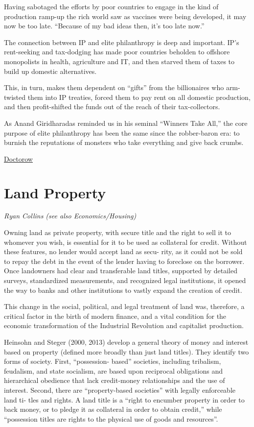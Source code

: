 \documentclass[
]{book}
\begin{document}
Having sabotaged the efforts by poor countries to engage in the kind of production ramp-up the rich world saw as vaccines were being developed, it may now be too late. ``Because of my bad ideas then, it's too late now.''

The connection between IP and elite philanthropy is deep and important. IP's rent-seeking and tax-dodging has made poor countries beholden to offshore monopolists in health, agriculture and IT, and then starved them of taxes to build up domestic alternatives.

This, in turn, makes them dependent on ``gifts'' from the billionaires who arm-twisted them into IP treaties, forced them to pay rent on all domestic production, and then profit-shifted the funds out of the reach of their tax-collectors.

As Anand Giridharadas reminded us in his seminal ``Winners Take All,'' the core purpose of elite philanthropy has been the same since the robber-baron era: to burnish the reputations of monsters who take everything and give back crumbs.

\href{https://pluralistic.net/2021/04/13/public-interest-pharma/\#gates-foundation}{Doctorow}

\hypertarget{land-property}{%
\section{Land Property}\label{land-property}}

\emph{Ryan Collins (see also Economics/Housing)}

Owning land as private property, with secure title and the right to sell
it to whomever you wish, is essential for it to be used as collateral for
credit. Without these features, no lender would accept land as secu-
rity, as it could not be sold to repay the debt in the event of the lender
having to foreclose on the borrower. Once landowners had clear and
transferable land titles, supported by detailed surveys, standardized
measurements, and recognized legal institutions, it opened the way
to banks and other institutions to vastly expand the creation of credit.

This change in the social, political, and legal treatment of land was,
therefore, a critical factor in the birth of modern finance, and a
vital condition for the economic transformation of the Industrial
Revolution and capitalist production.

Heinsohn and Steger (2000, 2013) develop a general theory of
money and interest based on property (defined more broadly than
just land titles). They identify two forms of society. First, ``possession-­
based'' societies, including tribalism, feudalism, and state socialism,
are based upon reciprocal obligations and hierarchical obedience
that lack credit-­money relationships and the use of interest. Second,
there are ``property-­based societies'' with legally enforceable land ti-
tles and rights. A land title is a ``right to encumber property in order
to back money, or to pledge it as collateral in order to obtain credit,''
while ``possession titles are rights to the physical use of goods and
resources''.
\end{document}
